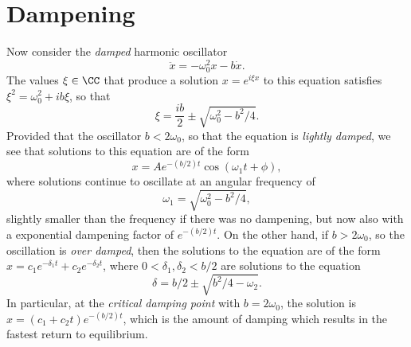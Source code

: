 \section{Dampening}

Now consider the \emph{damped} harmonic oscillator
%
\[ \ddot{x} = -\omega_0^2 x - b \dot{x}. \]
%
The values $\xi \in \CC$ that produce a solution $x = e^{i \xi x}$ to this equation satisfies $\xi^2 = \omega_0^2 + ib \xi$, so that
\[ \xi = \frac{ib}{2} \pm \sqrt{\omega_0^2 - b^2/4}. \]
%
Provided that the oscillator $b < 2 \omega_0$, so that the equation is \emph{lightly damped}, we see that solutions to this equation are of the form
%
\[ x = A e^{- (b/2) t} \cos(\omega_1 t + \phi), \]
%
where solutions continue to oscillate at an angular frequency of
%
\[ \omega_1 = \sqrt{\omega_0^2 - b^2 / 4}, \]
%
slightly smaller than the frequency if there was no dampening, but now also with a exponential dampening factor of $e^{-(b/2)t}$. On the other hand, if $b > 2 \omega_0$, so the oscillation is \emph{over damped}, then the solutions to the equation are of the form $x = c_1 e^{-\delta_1 t} + c_2 e^{-\delta_2 t}$, where $0 < \delta_1, \delta_2 < b/2$ are solutions to the equation
%
\[ \delta = b/2 \pm \sqrt{b^2 / 4 - \omega_2}. \]
%
In particular, at the \emph{critical damping point} with $b = 2 \omega_0$, the solution is $x = (c_1 + c_2 t) e^{- (b/2) t}$, which is the amount of damping which results in the fastest return to equilibrium.

